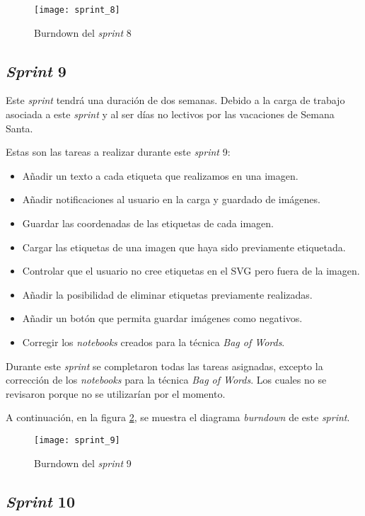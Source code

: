 \begin{figure}
\centering
\texttt{[image: sprint\_8]}
\caption{Burndown del \textit{sprint} 8}
\label{fig:A.1.9}
\end{figure}

\subsection{\textit{Sprint} 9}

Este \textit{sprint} tendrá una duración de dos semanas. Debido  a la carga de trabajo asociada a este \textit{sprint} y al ser días no lectivos por las vacaciones de Semana Santa. 

Estas son las tareas a realizar durante este \textit{sprint} 9:

\begin{itemize}
	\item Añadir un texto a cada etiqueta que realizamos en una imagen.
	\item Añadir notificaciones al usuario en la carga y guardado de imágenes.
	\item Guardar las coordenadas de las etiquetas de cada imagen.
	\item Cargar las etiquetas de una imagen que haya sido previamente etiquetada.
	\item Controlar que el usuario no cree etiquetas en el SVG pero fuera de la imagen.
	\item Añadir la posibilidad de eliminar etiquetas previamente realizadas.
	\item Añadir un botón que permita guardar imágenes como negativos.
	\item Corregir los \textit{notebooks} creados para la técnica \textit{Bag of Words}.
\end{itemize}

Durante este \textit{sprint} se completaron todas las tareas asignadas, excepto la corrección de los \textit{notebooks} para la técnica \textit{Bag of Words}. Los cuales no se revisaron porque no se utilizarían por el momento.

A continuación, en la figura \ref{fig:A.1.10}, se muestra el diagrama \textit{burndown} de este \textit{sprint}.

\begin{figure}
\centering
\texttt{[image: sprint\_9]}
\caption{Burndown del \textit{sprint} 9}
\label{fig:A.1.10}
\end{figure}


\subsection{\textit{Sprint} 10}

